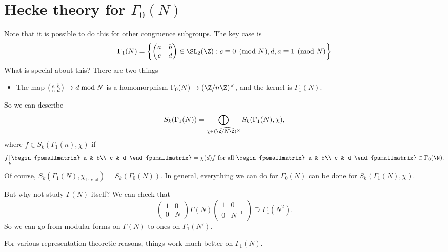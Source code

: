 \documentclass[a4paper]{article}
\begin{document}
\section{Hecke theory for \texorpdfstring{$\Gamma_0(N)$}{Gamma_0(N)}}
Note that it is possible to do this for other congruence subgroups. The key case is
\[
  \Gamma_1(N) =
  \left\{
    \begin{pmatrix}
      a & b\\
      c & d
    \end{pmatrix} \in \SL_2(\Z) : c \equiv 0 \pmod N, d , a \equiv 1 \pmod N
  \right\}
\]
What is special about this? There are two things
\begin{itemize}
  \item The map $ \begin{psmallmatrix} a & b\\ c & d \end{psmallmatrix} \mapsto d \bmod N$ is a homomorphism $\Gamma_0(N) \to (\Z/n\Z)^\times$, and the kernel is $\Gamma_1(N)$.
\end{itemize}
So we can describe
\[
  S_k(\Gamma_1(N)) = \bigoplus_{\chi \in \widehat{(\Z/N\Z)^\times}} S_k(\Gamma_1(N), \chi),
\]
where $f \in S_k(\Gamma_1(n), \chi)$ if
\[
  f \underset{k}{|}
  \begin{psmallmatrix}
    a & b\\
    c & d
  \end{psmallmatrix} = \chi(d) f\text{ for all }
  \begin{psmallmatrix}
    a & b\\
    c & d
  \end{psmallmatrix} \in \Gamma_0(\N).
\]
Of course, $S_k(\Gamma_1(N), \chi_{\mathrm{trivial}}) = S_k(\Gamma_0(N))$. In general, everything we can do for $\Gamma_0(N)$ can be done for $S_k(\Gamma_1(N), \chi)$.

But why not study $\Gamma(N)$ itself? We can check that
\[
  \begin{pmatrix}
    1 & 0\\
    0 & N
  \end{pmatrix} \Gamma(N)
  \begin{pmatrix}
    1 & 0\\
    0 & N^{-1}
  \end{pmatrix} \supseteq \Gamma_1(N^2).
\]
So we can go from modular forms on $\Gamma(N)$ to ones on $\Gamma_1(N')$.

For various representation-theoretic reasons, things work much better on $\Gamma_1(N)$.
\end{document}
